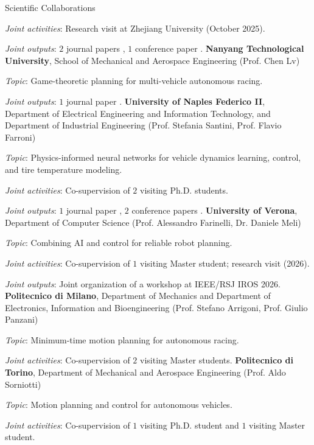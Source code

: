\begin{rubric}{Scientific Collaborations}
    \par \textit{Joint activities}: Research visit at Zhejiang University (October 2025).
    \par \textit{Joint outputs}: $2$ journal papers \cite{Li2026_game,Li2026}, $1$ conference paper \cite{Zhou2025}.
%
\entry*[Singapore]%
	\textbf{Nanyang Technological University}, School of Mechanical and Aerospace Engineering (Prof. Chen Lv)
    \par \textit{Topic}: Game-theoretic planning for multi-vehicle autonomous racing.
    \par \textit{Joint outputs}: $1$ journal paper \cite{Li2026_game}.
%
\entry*[Italy]%
	\textbf{University of Naples Federico II}, Department of Electrical Engineering and Information Technology, and Department of Industrial Engineering (Prof. Stefania Santini, Prof. Flavio Farroni)
    \par \textit{Topic}: Physics-informed neural networks for vehicle dynamics learning, control, and tire temperature modeling.
    \par \textit{Joint activities}: Co-supervision of $2$ visiting Ph.D. students.
    \par \textit{Joint outputs}: $1$ journal paper \cite{Mungiello2026}, $2$ conference papers \cite{Piccinini_A2RL_2025,Piccinini2026_roboracer}.
%
\entry*[Italy]%
	\textbf{University of Verona}, Department of Computer Science (Prof. Alessandro Farinelli, Dr. Daniele Meli)
    \par \textit{Topic}: Combining AI and control for reliable robot planning.
    \par \textit{Joint activities}: Co-supervision of $1$ visiting Master student; research visit (2026).
    \par \textit{Joint outputs}: Joint organization of a workshop at IEEE/RSJ IROS 2026.
%
\entry*[Italy]%
	\textbf{Politecnico di Milano}, Department of Mechanics and Department of Electronics, Information and Bioengineering (Prof. Stefano Arrigoni, Prof. Giulio Panzani)
    \par \textit{Topic}: Minimum-time motion planning for autonomous racing.
    \par \textit{Joint activities}: Co-supervision of $2$ visiting Master students.
%
\entry*[Italy]%
	\textbf{Politecnico di Torino}, Department of Mechanical and Aerospace Engineering (Prof. Aldo Sorniotti)
    \par \textit{Topic}: Motion planning and control for autonomous vehicles.
    \par \textit{Joint activities}: Co-supervision of $1$ visiting Ph.D. student and $1$ visiting Master student.

\end{rubric}
